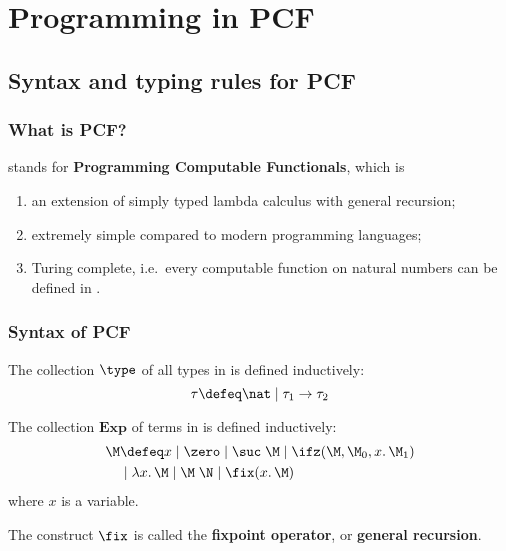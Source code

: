 \section{Programming in PCF}
\subsection{Syntax and typing rules for PCF}
\begin{frame}
  \frametitle{What is PCF?}
  \PCF{} stands for \textbf{Programming Computable Functionals}, which is
  \begin{enumerate}
    \item an extension of simply typed lambda calculus with general recursion; 
    \item extremely simple compared to modern programming languages;
    \item Turing complete, i.e.\ every computable function on natural numbers
      can be defined in \PCF.
  \end{enumerate}
\end{frame}
\begin{frame}
  \frametitle{Syntax of PCF}
  \begin{definition}
    The collection $\type$ of all types in \PCF{} is defined inductively:
    \[
      \tau \defeq \nat \mid \tau_1 \to \tau_2
    \]
  \end{definition}
  \begin{definition}
    The collection $\mathbf{Exp}$ of terms in \PCF{} is defined inductively:
    \begin{align*}
      \M & \defeq x \mid \zero \mid \suc\;\M \mid \ifz(\M, \M_0, x .\,\M_1) \\
      & \mid \lambda x .\, \M  \mid \M\;\N \mid \fix (x .\,\M)
    \end{align*}
    where $x$ is a variable. 
  \end{definition}
  The construct $\fix$ is called the \textbf{fixpoint operator}, or
  \textbf{general recursion}.
\end{frame}
